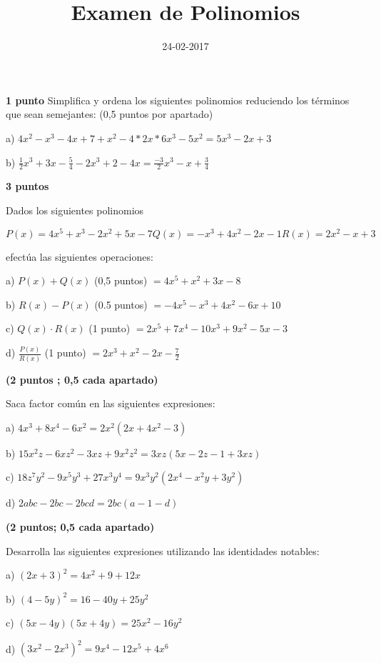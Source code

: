 \documentclass[palatino,noprobframes]{CuartillaSafa}
\title{Examen de Polinomios}
\date{24-02-2017}
\begin{document}
\cabecera
\pagestyle{fancy}

\begin{problem}\textbf{1 punto}
Simplifica y ordena los siguientes polinomios reduciendo los términos que sean semejantes: (0,5 puntos por apartado)

a) $4x^2-x^3-4x+7+x^2-4*2x*6x^3-5x^2 = 5x^3-2x+3$

b) $\frac{1}{2}x^3+3x-\frac{5}{4}-2x^3+2-4x = \frac{-3}{2}x^3-x+\frac{3}{4}$

\end{problem}

\begin{problem}\textbf{3 puntos}

Dados los siguientes polinomios

\[
P(x) = 4x^5+x^3-2x^2+5x - 7 
Q(x) = -x^3+4x^2-2x-1 
R(x) = 2x^2-x+3
\]

efectúa las siguientes operaciones:

a) $P(x) +Q(x)$ (0,5 puntos) $= 4x^5+x^2+3x-8$

b) $R(x) - P(x)$ (0.5 puntos) $=-4x^5-x^3+4x^2-6x+10$

c) $Q(x)\cdot R(x)$ (1 punto) $=2x^5+7x^4-10x^3+9x^2-5x-3$

d) $\frac{P(x)}{R(x)}$ (1 punto) $= 2x^3+x^2-2x-\frac{7}{2}$

\end{problem}

\begin{problem}\textbf{(2 puntos ; 0,5 cada apartado)}

Saca factor común en las siguientes expresiones:

a) $4x^3+8x^4-6x^2 = 2x^2(2x+4x^2-3)$

b) $15x^2z-6xz^2-3xz+9x^2z^2 = 3xz(5x-2z-1+3xz)$

c) $18z^7y^2-9x^5y^3+27x^3y^4 = 9x^3y^2(2x^4-x^2y+3y^2)$

d) $2abc-2bc-2bcd = 2bc(a-1-d)$

\end{problem}


\begin{problem}\textbf{(2 puntos; 0,5 cada apartado)}

Desarrolla las siguientes expresiones utilizando las identidades notables:

a) $(2x+3)^2 = 4x^2+9+12x$

b) $(4-5y)^2 = 16-40y+25y^2$

c) $(5x-4y)(5x+4y) = 25x^2-16y^2$

d) $\left(3x^2-2x^3\right)^2 = 9x^4 - 12x^5 + 4x^6$
	
\end{problem}
\end{document}
